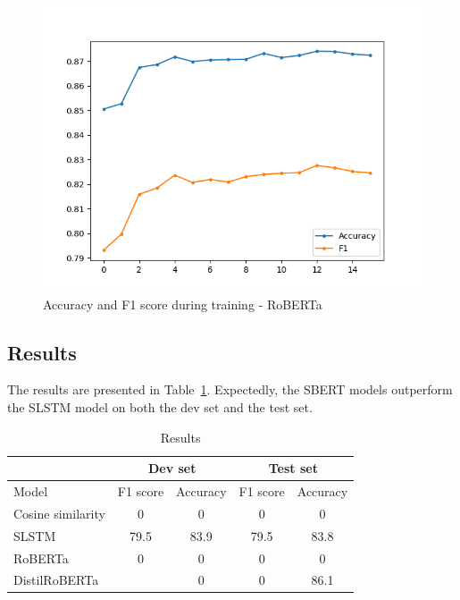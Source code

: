 \documentclass[10pt, a4paper]{article}
\begin{document}
\begin{figure}
\begin{center}
\includegraphics[width=\columnwidth]{figures/train-metrics-roberta.png}
\caption{Accuracy and F1 score during training - RoBERTa}
\label{fig:train-metrics-roberta}
\end{center}
\end{figure}

\subsection{Results} \label{results}

The results are presented in Table~\ref{tab:results}.
Expectedly, the SBERT models outperform the SLSTM model on both the dev set and the test set.

\begin{table}
\caption{Results}
\label{tab:results}
\begin{center}
\begin{tabular}{lcccc}
\toprule
 & \multicolumn{2}{c}{Dev set} & \multicolumn{2}{c}{Test set} \\
\midrule
Model & F1 score & Accuracy & F1 score & Accuracy \\
\midrule
Cosine similarity & 0 & 0 & 0 & 0 \\
SLSTM & 79.5 & 83.9 & 79.5 & 83.8 \\
RoBERTa & 0 & 0 & 0 & 0 \\
DistilRoBERTa &  & 0 & 0 & 86.1 \\
\bottomrule
\end{tabular}
\end{center}
\end{table}
\end{document}
